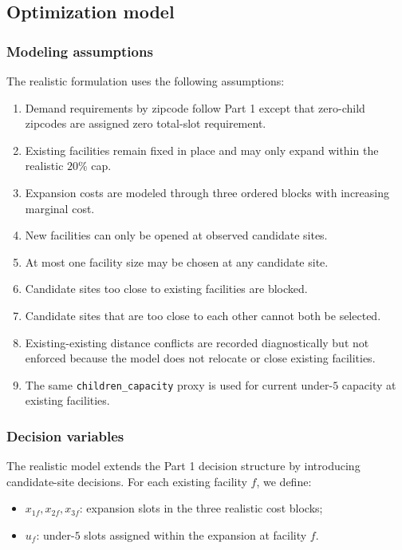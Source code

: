 \documentclass[11pt]{article}
\newcommand{\1}{\mathbb{I}}
\begin{document}
\subsection{Optimization model}

\subsubsection{Modeling assumptions}

The realistic formulation uses the following assumptions:

\begin{enumerate}
    \item Demand requirements by zipcode follow Part 1 except that zero-child zipcodes are assigned zero total-slot requirement.
    \item Existing facilities remain fixed in place and may only expand within the realistic \(20\%\) cap.
    \item Expansion costs are modeled through three ordered blocks with increasing marginal cost.
    \item New facilities can only be opened at observed candidate sites.
    \item At most one facility size may be chosen at any candidate site.
    \item Candidate sites too close to existing facilities are blocked.
    \item Candidate sites that are too close to each other cannot both be selected.
    \item Existing-existing distance conflicts are recorded diagnostically but not enforced because the model does not relocate or close existing facilities.
    \item The same \texttt{children\_capacity} proxy is used for current under-\(5\) capacity at existing facilities.
\end{enumerate}

\subsubsection{Decision variables}

The realistic model extends the Part 1 decision structure by introducing candidate-site decisions. For each existing facility \(f\), we define:
\begin{itemize}
    \item \(x_{1f}, x_{2f}, x_{3f}\): expansion slots in the three realistic cost blocks;
    \item \(u_f\): under-\(5\) slots assigned within the expansion at facility \(f\).
\end{itemize}
\end{document}
